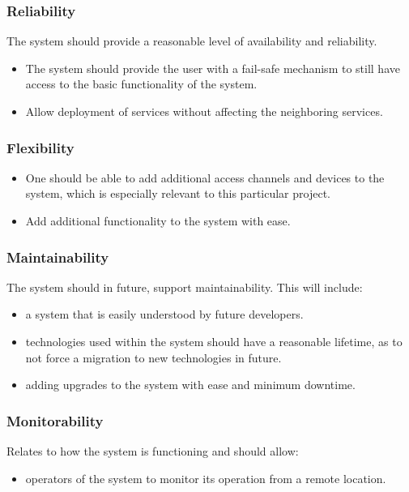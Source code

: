 \documentclass[a4paper,12pt]{article}
\begin{document}
	\subsubsection{Reliability}
	The system should provide a reasonable level of availability and reliability.
	\begin{itemize}
		\item The system should provide the user with a fail-safe mechanism to still have access to the basic functionality of the system.
		\item Allow deployment of services without affecting the neighboring services. 
	\end{itemize}
	
	\subsubsection{Flexibility}
	\begin{itemize}
		\item One should be able to add additional access channels and devices to the system, which is especially relevant to this particular project.
		\item Add additional functionality to the system with ease.
	\end{itemize}
	
	\subsubsection{Maintainability}
	The system should in future, support maintainability. This will include:
	\begin{itemize}
		\item a system that is easily understood by future developers.
		\item technologies used within the system should have a reasonable lifetime, as to not force a migration to new technologies in future.
		\item adding upgrades to the system with ease and minimum downtime.
	\end{itemize}
	
	\subsubsection{Monitorability}
	Relates to how the system is functioning and should allow:
	\begin{itemize}
		\item operators of the system to monitor its operation from a remote location.  
	\end{itemize}
	
\end{document}
